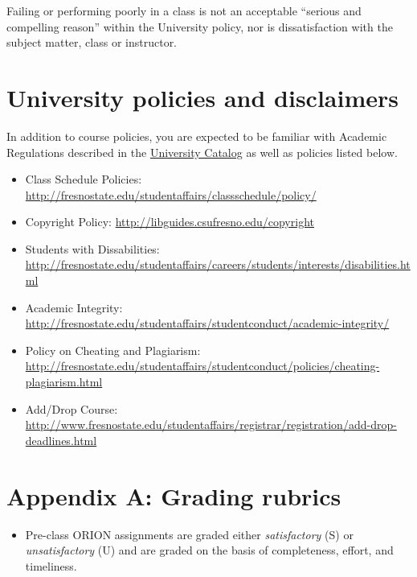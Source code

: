 Failing or performing poorly in a class is not an acceptable ``serious
and compelling reason'' within the University policy, nor is
dissatisfaction with the subject matter, class or instructor.

\hypertarget{university-policies-and-disclaimers}{%
\section{University policies and
disclaimers}\label{university-policies-and-disclaimers}}

In addition to course policies, you are expected to be familiar with
Academic Regulations described in the
\href{http://www.fresnostate.edu/catalog/academic-regulations/}{University
Catalog} as well as policies listed below.

\begin{itemize}
\tightlist
\item
  Class Schedule Policies:
  \url{http://fresnostate.edu/studentaffairs/classschedule/policy/}
\item
  Copyright Policy: \url{http://libguides.csufresno.edu/copyright}
\item
  Students with Dissabilities:
  \url{http://fresnostate.edu/studentaffairs/careers/students/interests/disabilities.html}
\item
  Academic Integrity:
  \url{http://fresnostate.edu/studentaffairs/studentconduct/academic-integrity/}
\item
  Policy on Cheating and Plagiarism:
  \url{http://fresnostate.edu/studentaffairs/studentconduct/policies/cheating-plagiarism.html}
\item
  Add/Drop Course:
  \href{http://fresnostate.edu/studentaffairs/classschedule/registration/add-drop.html}{http://www.fresnostate.edu/studentaffairs/registrar/registration/add-drop-deadlines.html}
\end{itemize}

\newpage

\hypertarget{rubrics}{%
\section{Appendix A: Grading rubrics}\label{rubrics}}

\begin{itemize}
\tightlist
\item
  Pre-class ORION assignments are graded either \emph{satisfactory} (S)
  or \emph{unsatisfactory} (U) and are graded on the basis of
  completeness, effort, and timeliness.
\end{itemize}

